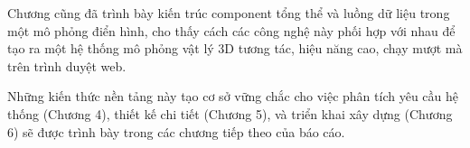 Chương cũng đã trình bày kiến trúc component tổng thể và luồng dữ liệu trong một mô phỏng điển hình, cho thấy cách các công nghệ này phối hợp với nhau để tạo ra một hệ thống mô phỏng vật lý 3D tương tác, hiệu năng cao, chạy mượt mà trên trình duyệt web.

Những kiến thức nền tảng này tạo cơ sở vững chắc cho việc phân tích yêu cầu hệ thống (Chương 4), thiết kế chi tiết (Chương 5), và triển khai xây dựng (Chương 6) sẽ được trình bày trong các chương tiếp theo của báo cáo.